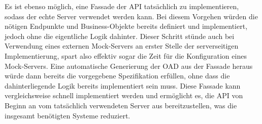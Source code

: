 Es ist ebenso möglich, eine Fassade der \ac{API} tatsächlich zu implementieren, sodass der echte Server verwendet werden kann.
Bei diesem Vorgehen würden die nötigen Endpunkte und Business-Objekte bereits definiert und implementiert, jedoch ohne die eigentliche Logik dahinter. Dieser Schritt stünde auch bei Verwendung eines externen Mock-Servers an erster Stelle der serverseitigen Implementierung, spart also effektiv sogar die Zeit für die Konfiguration eines Mock-Servers.
Eine automatische Generierung der \ac{OAD} aus der Fassade heraus würde dann bereits die vorgegebene Spezifikation erfüllen, ohne dass die dahinterliegende Logik bereits implementiert sein muss.
Diese Fassade kann vergleichsweise schnell implementiert werden und ermöglicht es, die \ac{API} von Beginn an vom tatsächlich verwendeten Server aus bereitzustellen, was die insgesamt benötigten Systeme reduziert.